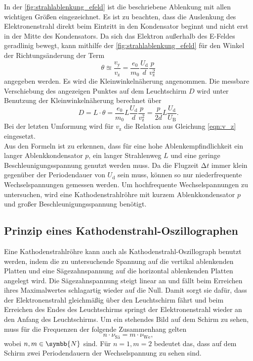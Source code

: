     \noindent In der \autoref{fig:strahlablenkung_efeld} ist die beschriebene Ablenkung mit allen wichtigen Größen eingezeichnet. Es ist zu beachten, dass die Auslenkung
    des Elektronenstrahl direkt beim Eintritt in den Kondensator beginnt und nicht erst in der Mitte des Kondensators. Da sich das Elektron außerhalb des E-Feldes 
    geradlinig bewegt, kann mithilfe der \autoref{fig:strahlablenkung_efeld} für den Winkel der Richtungsänderung der Term 
    \begin{equation*}
        \theta \approxeq \frac{v_{\text{y}}}{v_{\text{z}}} = \frac{e_0}{m_0} \frac{U_{\text{d}}}{d} \frac{p}{v_{\text{z}}^2}
    \end{equation*}
    angegeben werden. Es wird die Kleinwinkelnäherung angenommen. Die messbare Verschiebung des angezeigen Punktes auf dem Leuchtschirm $D$ wird unter Benutzung der Kleinwinkelnäherung
    berechnet über
    \begin{equation}
        \label{eqn:pL_2d}
        D = L \cdot \theta = \frac{e_0}{m_0} L \frac{U_{\text{d}}}{d} \frac{p}{v_{\text{z}}^2} = \frac{p}{2d} L \frac{U_{\text{d}}}{U_{\text{B}}}. 
    \end{equation}
    Bei der letzten Umformung wird für $v_{\text{z}}$ die Relation aus Gleichung \eqref{eqn:v_z} eingesetzt. \\

    \noindent Aus den Formeln ist zu erkennen, dass für eine hohe Ablenkempfindlichkeit ein langer Ablenkkondensator $p$, ein langer Strahlenweg $L$ und eine geringe Beschleunigungsspannung 
    genutzt werden muss. Da die Flugzeit $\increment t$ immer klein gegenüber der Periodendauer von $U_{\text{d}}$ sein muss, können so nur niederfrequente Wechselspannungen gemessen
    werden. Um hochfrequente Wechselspannungen zu untersuchen, wird eine Kathodenstrahlröhre mit kurzem Ablenkkondensator $p$ und großer Beschleunigungsspannung benötigt.

\subsection{Prinzip eines Kathodenstrahl-Oszillographen}

    Eine Kathodenstrahlröhre kann auch als Kathodenstrahl-Oszillograph benutzt werden, indem die zu untersuchende Spannung auf die vertikal ablenkenden Platten und eine Sägezahnspannung 
    auf die horizontal ablenkenden Platten angelegt wird. Die Sägezahnspannung steigt linear an und fällt beim Erreichen ihres Maximalwertes schlagartig wieder auf die Null. 
    Damit sorgt sie dafür, dass der Elektronenstrahl gleichmäßig über den Leuchtschirm fährt und beim Erreichen des Endes des Leuchtschirms springt der Elektronenstrahl wieder an
    den Anfang des Leuchtschirms. Um ein stehendes Bild auf dem Schirm zu sehen, muss für die Frequenzen der folgende Zusammenhang gelten
    \begin{equation}\label{eqn:frequenzen}
        n \cdot \nu_{\text{Sä}} = m \cdot \nu_{\text{We}},
    \end{equation}
    wobei $n,m \in \symbb{N}$ sind. Für $n=1, m=2$ bedeutet das, dass auf dem Schirm zwei Periodendauern der Wechselspannung zu sehen sind.

